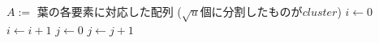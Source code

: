 \documentclass[main]{subfiles}
\begin{document}
\begin{algorithm}[H]
\caption{$\Min(V)$}
\begin{algorithmic}[1]
\scriptsize
\Require
	\Statex $A :=$ 葉の各要素に対応した配列 
	\Statex ($\sqrt{u}$個に分割したものが$cluster$)
	\State $i \gets 0$
		\State $i \gets i+1$
	\EndWhile
	\State $j \gets 0$
		\State $j \gets j+1$
	\EndWhile
\EndFunction
\end{algorithmic}
\end{algorithm}
\end{document}
